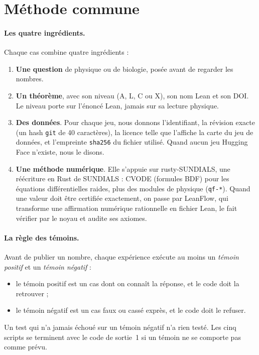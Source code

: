 \section{Méthode commune}\label{ch5:methode}

\paragraph{Les quatre ingrédients.} Chaque cas combine quatre ingrédients :
\begin{enumerate}
\item \textbf{Une question} de physique ou de biologie, posée avant de regarder les nombres.
\item \textbf{Un théorème}, avec son niveau (A, L, C ou X), son nom Lean et son DOI. Le niveau porte sur
l'énoncé Lean, jamais sur sa lecture physique.
\item \textbf{Des données}. Pour chaque jeu, nous donnons l'identifiant, la révision exacte (un hash \texttt{git}
de 40 caractères), la licence telle que l'affiche la carte du jeu de données, et l'empreinte \texttt{sha256} du
fichier utilisé. Quand aucun jeu Hugging Face n'existe, nous le disons.
\item \textbf{Une méthode numérique}. Elle s'appuie sur rusty-SUNDIALS, une réécriture en Rust de SUNDIALS : CVODE
(formules BDF) pour les équations différentielles raides, plus des modules de physique (\texttt{qf-*}). Quand
une valeur doit être certifiée exactement, on passe par LeanFlow, qui transforme une affirmation numérique
rationnelle en fichier Lean, le fait vérifier par le noyau et audite ses axiomes.
\end{enumerate}

\paragraph{La règle des témoins.} Avant de publier un nombre, chaque expérience exécute au moins un
\emph{témoin positif} et un \emph{témoin négatif} :
\begin{itemize}
\item le témoin positif est un cas dont on connaît la réponse, et le code doit la retrouver ;
\item le témoin négatif est un cas faux ou cassé exprès, et le code doit le refuser.
\end{itemize}
Un test qui n'a jamais échoué sur un témoin négatif n'a rien testé. Les cinq scripts se terminent avec le code de
sortie~1 si un témoin ne se comporte pas comme prévu.

